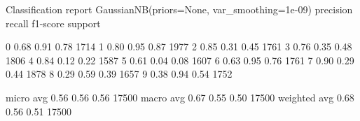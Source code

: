 \documentclass{article}
\begin{document}
\begin{pyconsole}
Classification report  GaussianNB(priors=None, var_smoothing=1e-09)
              precision    recall  f1-score   support

           0       0.68      0.91      0.78      1714
           1       0.80      0.95      0.87      1977
           2       0.85      0.31      0.45      1761
           3       0.76      0.35      0.48      1806
           4       0.84      0.12      0.22      1587
           5       0.61      0.04      0.08      1607
           6       0.63      0.95      0.76      1761
           7       0.90      0.29      0.44      1878
           8       0.29      0.59      0.39      1657
           9       0.38      0.94      0.54      1752

   micro avg       0.56      0.56      0.56     17500
   macro avg       0.67      0.55      0.50     17500
weighted avg       0.68      0.56      0.51     17500

\end{pyconsole}
\end{document}
